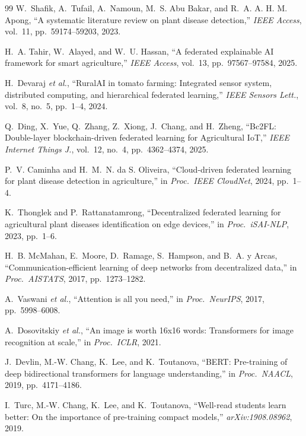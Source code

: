 \documentclass[conference]{IEEEtran}
\begin{document}
\begin{thebibliography}{99}
W.~Shafik, A.~Tufail, A.~Namoun, M.~S. Abu Bakar, and R.~A. A. H. M. Apong, ``A
systematic literature review on plant disease detection,'' \emph{IEEE Access},
vol.~11, pp.~59174--59203, 2023.

H.~A. Tahir, W.~Alayed, and W.~U. Hassan, ``A federated explainable {AI} framework
for smart agriculture,'' \emph{IEEE Access}, vol.~13, pp.~97567--97584, 2025.

H.~Devaraj \emph{et al.}, ``{RuralAI} in tomato farming: Integrated sensor system,
distributed computing, and hierarchical federated learning,'' \emph{IEEE Sensors
Lett.}, vol.~8, no.~5, pp.~1--4, 2024.

Q.~Ding, X.~Yue, Q.~Zhang, Z.~Xiong, J.~Chang, and H.~Zheng, ``{Bc2FL}:
Double-layer blockchain-driven federated learning for Agricultural {IoT},''
\emph{IEEE Internet Things J.}, vol.~12, no.~4, pp.~4362--4374, 2025.

P.~V. Caminha and H.~M.~N. da S. Oliveira, ``Cloud-driven federated learning for
plant disease detection in agriculture,'' in \emph{Proc.\ IEEE CloudNet}, 2024,
pp.~1--4.

K.~Thonglek and P.~Rattanatamrong, ``Decentralized federated learning for
agricultural plant diseases identification on edge devices,'' in \emph{Proc.\
iSAI-NLP}, 2023, pp.~1--6.

H.~B. McMahan, E.~Moore, D.~Ramage, S.~Hampson, and B.~A. y Arcas,
``Communication-efficient learning of deep networks from decentralized data,'' in
\emph{Proc.\ AISTATS}, 2017, pp.~1273--1282.

A.~Vaswani \emph{et al.}, ``Attention is all you need,'' in \emph{Proc.\ NeurIPS},
2017, pp.~5998--6008.

A.~Dosovitskiy \emph{et al.}, ``An image is worth 16x16 words: Transformers for
image recognition at scale,'' in \emph{Proc.\ ICLR}, 2021.

J.~Devlin, M.-W. Chang, K.~Lee, and K.~Toutanova, ``BERT: Pre-training of deep
bidirectional transformers for language understanding,'' in \emph{Proc.\ NAACL},
2019, pp.~4171--4186.

I.~Turc, M.-W. Chang, K.~Lee, and K.~Toutanova, ``Well-read students learn better:
On the importance of pre-training compact models,'' \emph{arXiv:1908.08962}, 2019.


\end{thebibliography}
\end{document}
